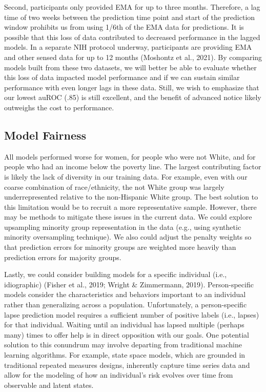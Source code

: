 \documentclass[
]{agujournal2019}
\begin{document}
Second, participants only provided EMA for up to three months.
Therefore, a lag time of two weeks between the prediction time point and
start of the prediction window prohibits us from using 1/6th of the EMA
data for predictions. It is possible that this loss of data contributed
to decreased performance in the lagged models. In a separate NIH
protocol underway, participants are providing EMA and other sensed data
for up to 12 months (Moshontz et al., 2021). By comparing models built
from these two datasets, we will better be able to evaluate whether this
loss of data impacted model performance and if we can sustain similar
performance with even longer lags in these data. Still, we wish to
emphasize that our lowest auROC (.85) is still excellent, and the
benefit of advanced notice likely outweighs the cost to performance.

\subsection{Model Fairness}\label{model-fairness}

All models performed worse for women, for people who were not White, and
for people who had an income below the poverty line. The largest
contributing factor is likely the lack of diversity in our training
data. For example, even with our coarse combination of race/ethnicity,
the not White group was largely underrepresented relative to the
non-Hispanic White group. The best solution to this limitation would be
to recruit a more representative sample. However, there may be methods
to mitigate these issues in the current data. We could explore
upsampling minority group representation in the data (e.g., using
synthetic minority oversampling technique). We also could adjust the
penalty weights so that prediction errors for minority groups are
weighted more heavily than prediction errors for majority groups.

Lastly, we could consider building models for a specific individual
(i.e., idiographic) (Fisher et al., 2019; Wright \& Zimmermann, 2019).
Person-specific models consider the characteristics and behaviors
important to an individual rather than generalizing across a population.
Unfortunately, a person-specific lapse prediction model requires a
sufficient number of positive labels (i.e., lapses) for that individual.
Waiting until an individual has lapsed multiple (perhaps many) times to
offer help is in direct opposition with our goals. One potential
solution to this conundrum may involve departing from traditional
machine learning algorithms. For example, state space models, which are
grounded in traditional repeated measures designs, inherently capture
time series data and allow for the modeling of how an individual's risk
evolves over time from observable and latent states.
\end{document}
